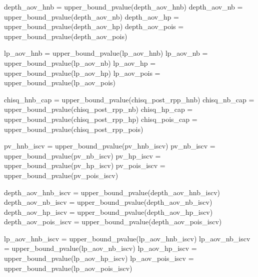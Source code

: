 \documentclass[
  english,
  letterpaper,
  DIV=11,
  numbers=noendperiod]{scrartcl}
\newenvironment{Shaded}{\begin{snugshade}}{\end{snugshade}}
\newcommand{\FunctionTok}[1]{\textcolor[rgb]{0.28,0.35,0.67}{#1}}
\newcommand{\NormalTok}[1]{\textcolor[rgb]{0.00,0.23,0.31}{#1}}
\newcommand{\OtherTok}[1]{\textcolor[rgb]{0.00,0.23,0.31}{#1}}
\begin{document}
\begin{Shaded}
\begin{Highlighting}[]
\NormalTok{depth\_aov\_hnb  }\OtherTok{=} \FunctionTok{upper\_bound\_pvalue}\NormalTok{(depth\_aov\_hnb)}
\NormalTok{depth\_aov\_nb   }\OtherTok{=} \FunctionTok{upper\_bound\_pvalue}\NormalTok{(depth\_aov\_nb)}
\NormalTok{depth\_aov\_hp   }\OtherTok{=} \FunctionTok{upper\_bound\_pvalue}\NormalTok{(depth\_aov\_hp)}
\NormalTok{depth\_aov\_pois }\OtherTok{=} \FunctionTok{upper\_bound\_pvalue}\NormalTok{(depth\_aov\_pois)}

\NormalTok{lp\_aov\_hnb  }\OtherTok{=} \FunctionTok{upper\_bound\_pvalue}\NormalTok{(lp\_aov\_hnb)}
\NormalTok{lp\_aov\_nb   }\OtherTok{=} \FunctionTok{upper\_bound\_pvalue}\NormalTok{(lp\_aov\_nb)}
\NormalTok{lp\_aov\_hp   }\OtherTok{=} \FunctionTok{upper\_bound\_pvalue}\NormalTok{(lp\_aov\_hp)}
\NormalTok{lp\_aov\_pois }\OtherTok{=} \FunctionTok{upper\_bound\_pvalue}\NormalTok{(lp\_aov\_pois)}

\NormalTok{chisq\_hnb\_cap  }\OtherTok{=} \FunctionTok{upper\_bound\_pvalue}\NormalTok{(chisq\_post\_rpp\_hnb)}
\NormalTok{chisq\_nb\_cap   }\OtherTok{=} \FunctionTok{upper\_bound\_pvalue}\NormalTok{(chisq\_post\_rpp\_nb)}
\NormalTok{chisq\_hp\_cap   }\OtherTok{=} \FunctionTok{upper\_bound\_pvalue}\NormalTok{(chisq\_post\_rpp\_hp)}
\NormalTok{chisq\_pois\_cap }\OtherTok{=} \FunctionTok{upper\_bound\_pvalue}\NormalTok{(chisq\_post\_rpp\_pois)}

\NormalTok{pv\_hnb\_iscv  }\OtherTok{=} \FunctionTok{upper\_bound\_pvalue}\NormalTok{(pv\_hnb\_iscv)}
\NormalTok{pv\_nb\_iscv   }\OtherTok{=} \FunctionTok{upper\_bound\_pvalue}\NormalTok{(pv\_nb\_iscv)}
\NormalTok{pv\_hp\_iscv   }\OtherTok{=} \FunctionTok{upper\_bound\_pvalue}\NormalTok{(pv\_hp\_iscv)}
\NormalTok{pv\_pois\_iscv }\OtherTok{=} \FunctionTok{upper\_bound\_pvalue}\NormalTok{(pv\_pois\_iscv)}

\NormalTok{depth\_aov\_hnb\_iscv  }\OtherTok{=} \FunctionTok{upper\_bound\_pvalue}\NormalTok{(depth\_aov\_hnb\_iscv)}
\NormalTok{depth\_aov\_nb\_iscv   }\OtherTok{=} \FunctionTok{upper\_bound\_pvalue}\NormalTok{(depth\_aov\_nb\_iscv)}
\NormalTok{depth\_aov\_hp\_iscv   }\OtherTok{=} \FunctionTok{upper\_bound\_pvalue}\NormalTok{(depth\_aov\_hp\_iscv)}
\NormalTok{depth\_aov\_pois\_iscv }\OtherTok{=} \FunctionTok{upper\_bound\_pvalue}\NormalTok{(depth\_aov\_pois\_iscv)}

\NormalTok{lp\_aov\_hnb\_iscv  }\OtherTok{=} \FunctionTok{upper\_bound\_pvalue}\NormalTok{(lp\_aov\_hnb\_iscv)}
\NormalTok{lp\_aov\_nb\_iscv   }\OtherTok{=} \FunctionTok{upper\_bound\_pvalue}\NormalTok{(lp\_aov\_nb\_iscv)}
\NormalTok{lp\_aov\_hp\_iscv   }\OtherTok{=} \FunctionTok{upper\_bound\_pvalue}\NormalTok{(lp\_aov\_hp\_iscv)}
\NormalTok{lp\_aov\_pois\_iscv }\OtherTok{=} \FunctionTok{upper\_bound\_pvalue}\NormalTok{(lp\_aov\_pois\_iscv)}


\end{Highlighting}
\end{Shaded}
\end{document}
